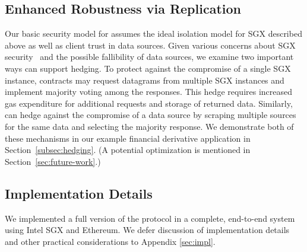 \subsection{Enhanced Robustness via Replication}
\label{subsec:enhanced_robustness}
Our basic security model for \tc assumes the ideal isolation model for SGX described above as well as client trust in data sources. Given various concerns about SGX security~\cite{sgxexplained,7163052} and the possible fallibility of data sources, we examine two important ways \tc can support hedging.
To protect against the compromise of a single SGX instance, contracts may request datagrams from multiple SGX instances and implement majority voting among the responses.
This hedge requires increased gas expenditure for additional requests and storage of returned data.
Similarly, \tc can hedge against the compromise of a data source by scraping multiple sources for the same data and selecting the majority response. We demonstrate both of these mechanisms in our example financial derivative application in Section~\ref{subsec:hedging}. (A potential optimization is mentioned in Section~\ref{sec:future-work}.)


\subsection{Implementation Details}
We implemented a full version of the \tc protocol in a complete, end-to-end system using Intel SGX and Ethereum.
We defer discussion of implementation details and other practical considerations to Appendix \ref{sec:impl}.

